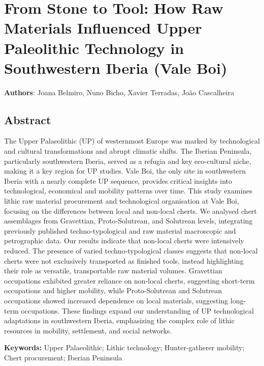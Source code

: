\documentclass[
  a4paper,
  DIV=11,
  numbers=noendperiod]{scrreprt}
\begin{document}

\chapter{From Stone to Tool: How Raw Materials Influenced Upper
Paleolithic Technology in Southwestern Iberia (Vale
Boi)}\label{from-stone-to-tool-how-raw-materials-influenced-upper-paleolithic-technology-in-southwestern-iberia-vale-boi}

\textbf{Authors}: Joana Belmiro, Nuno Bicho, Xavier Terradas, João
Cascalheira

\newpage

\section{Abstract}\label{abstract-3}

The Upper Palaeolithic (UP) of westernmost Europe was marked by
technological and cultural transformations and abrupt climatic shifts.
The Iberian Peninsula, particularly southwestern Iberia, served as a
refugia and key eco-cultural niche, making it a key region for UP
studies. Vale Boi, the only site in southwestern Iberia with a nearly
complete UP sequence, provides critical insights into technological,
economical and mobility patterns over time. This study examines lithic
raw material procurement and technological organisation at Vale Boi,
focusing on the differences between local and non-local cherts. We
analysed chert assemblages from Gravettian, Proto-Solutrean, and
Solutrean levels, integrating previously published techno-typological
and raw material macroscopic and petrographic data. Our results indicate
that non-local cherts were intensively reduced. The presence of varied
techno-typological classes suggests that non-local cherts were not
exclusively transported as finished tools, instead highlighting their
role as versatile, transportable raw material volumes. Gravettian
occupations exhibited greater reliance on non-local cherts, suggesting
short-term occupations and higher mobility, while Proto-Solutrean and
Solutrean occupations showed increased dependence on local materials,
suggesting long-term occupations. These findings expand our
understanding of UP technological adaptations in southwestern Iberia,
emphasizing the complex role of lithic resources in mobility,
settlement, and social networks.

\textbf{Keywords:} Upper Palaeolithic; Lithic technology;
Hunter-gatherer mobility; Chert procurement; Iberian Peninsula
\end{document}

